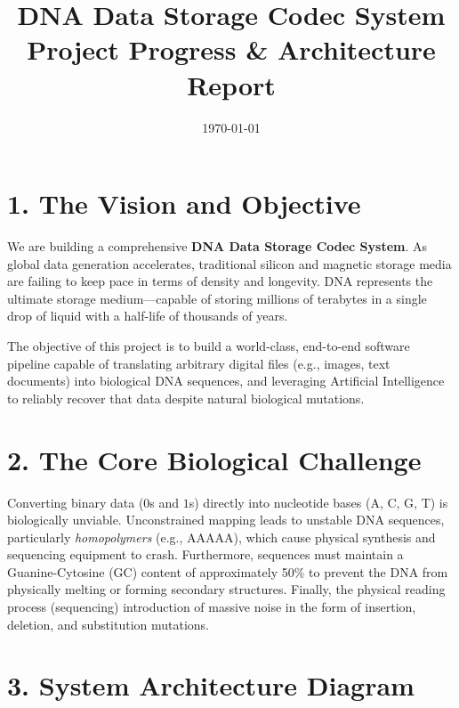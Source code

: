 \documentclass[12pt, a4paper]{article}
\title{\textbf{DNA Data Storage Codec System}\\ \Large Project Progress \& Architecture Report}
\author{}
\date{\today}
\begin{document}
\maketitle

\section*{1. The Vision and Objective}
We are building a comprehensive \textbf{DNA Data Storage Codec System}. As global data generation accelerates, traditional silicon and magnetic storage media are failing to keep pace in terms of density and longevity. DNA represents the ultimate storage medium—capable of storing millions of terabytes in a single drop of liquid with a half-life of thousands of years. 

The objective of this project is to build a world-class, end-to-end software pipeline capable of translating arbitrary digital files (e.g., images, text documents) into biological DNA sequences, and leveraging Artificial Intelligence to reliably recover that data despite natural biological mutations.

\section*{2. The Core Biological Challenge}
Converting binary data ($0$s and $1$s) directly into nucleotide bases (A, C, G, T) is biologically unviable. Unconstrained mapping leads to unstable DNA sequences, particularly \textit{homopolymers} (e.g., AAAAA), which cause physical synthesis and sequencing equipment to crash. Furthermore, sequences must maintain a Guanine-Cytosine (GC) content of approximately 50\% to prevent the DNA from physically melting or forming secondary structures. Finally, the physical reading process (sequencing) introduction of massive noise in the form of insertion, deletion, and substitution mutations.

\section*{3. System Architecture Diagram}
\end{document}
